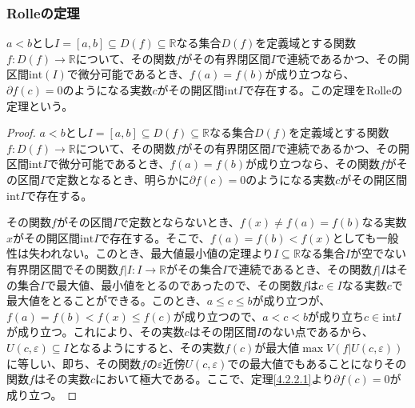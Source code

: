 \documentclass[dvipdfmx]{jsarticle}
\begin{document}
\subsubsection{Rolleの定理}%
\begin{thm}[Rolleの定理]\label{4.2.2.2}
$a < b$とし$I = [ a,b] \subseteq D(f) \subseteq \mathbb{R}$なる集合$D(f)$を定義域とする関数$f:D(f) \rightarrow \mathbb{R}$について、その関数$f$がその有界閉区間$I$で連続であるかつ、その開区間$\mathrm{int}(I)$で微分可能であるとき、$f(a) = f(b)$が成り立つなら、$\partial f(c) = 0$のようになる実数$c$がその開区間$\mathrm{int}I$で存在する。この定理をRolleの定理という。
\end{thm}
\begin{proof}
$a < b$とし$I = [ a,b] \subseteq D(f) \subseteq \mathbb{R}$なる集合$D(f)$を定義域とする関数$f:D(f) \rightarrow \mathbb{R}$について、その関数$f$がその有界閉区間$I$で連続であるかつ、その開区間$\mathrm{int}I$で微分可能であるとき、$f(a) = f(b)$が成り立つなら、その関数$f$がその区間$I$で定数となるとき、明らかに$\partial f(c) = 0$のようになる実数$c$がその開区間$\mathrm{int}I$で存在する。\par
その関数$f$がその区間$I$で定数とならないとき、$f(x) \neq f(a) = f(b)$なる実数$x$がその開区間$\mathrm{int}I$で存在する。そこで、$f(a) = f(b) < f(x)$としても一般性は失われない。このとき、最大値最小値の定理より$I \subseteq \mathbb{R}$なる集合$I$が空でない有界閉区間でその関数$f|I:I \rightarrow \mathbb{R}$がその集合$I$で連続であるとき、その関数$f|I$はその集合$I$で最大値、最小値をとるのであったので、その関数$f$は$c \in I$なる実数$c$で最大値をとることができる。このとき、$a \leq c \leq b$が成り立つが、$f(a) = f(b) < f(x) \leq f(c)$が成り立つので、$a < c < b$が成り立ち$c \in \mathrm{int}I$が成り立つ。これにより、その実数$c$はその閉区間$I$のない点であるから、$U(c,\varepsilon) \subseteq I$となるようにすると、その実数$f(c)$が最大値$\max{V\left( f|U(c,\varepsilon) \right)}$に等しい、即ち、その関数$f$の$\varepsilon$近傍$U(c,\varepsilon)$での最大値でもあることになりその関数$f$はその実数$c$において極大である。ここで、定理\ref{4.2.2.1}より$\partial f(c) = 0$が成り立つ。
\end{proof}
\end{document}
